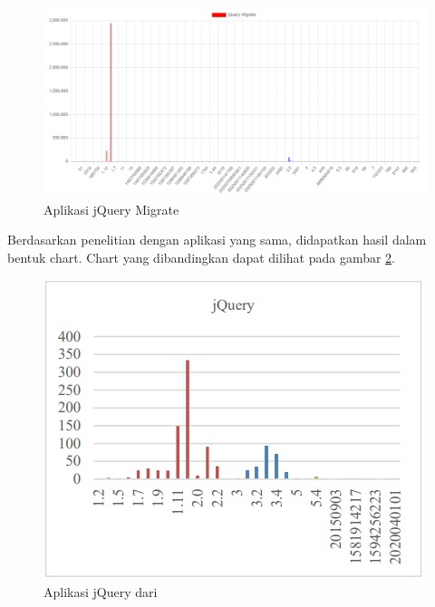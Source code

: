 \begin{figure}[H]
	\centering  
	\includegraphics[scale=0.7]{Gambar/data_sample_jQuery_migrate.png}  
	\caption{Aplikasi jQuery Migrate} 
	\label{fig:data_sample_jQuery_migrate} 
\end{figure}

Berdasarkan penelitian dengan aplikasi yang sama, didapatkan hasil dalam bentuk chart. Chart yang dibandingkan dapat dilihat pada gambar \ref{fig:data_sample_jQuery_p}.

\begin{figure}[H]
	\centering  
	\includegraphics[scale=0.7]{Gambar/chart_pascal_jQuery.PNG}  
	\caption{Aplikasi jQuery dari \cite{pascal}} 
	\label{fig:data_sample_jQuery_p} 
\end{figure}